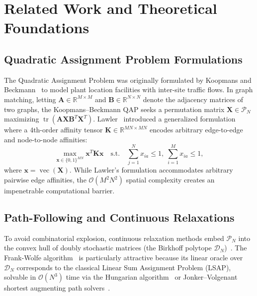 \documentclass[a4paper,fleqn]{cas-dc}
\theoremstyle{thmstyleone}
\theoremstyle{thmstyletwo}
\theoremstyle{thmstylethree}
\begin{document}
\section{Related Work and Theoretical Foundations}
\label{sec:related}

\subsection{Quadratic Assignment Problem Formulations}
The Quadratic Assignment Problem was originally formulated by Koopmans and Beckmann~\cite{koopmans1957} to model plant location facilities with inter-site traffic flows. In graph matching, letting $\mathbf{A} \in \mathbb{R}^{M \times M}$ and $\mathbf{B} \in \mathbb{R}^{N \times N}$ denote the adjacency matrices of two graphs, the Koopmans--Beckmann QAP seeks a permutation matrix $\mathbf{X} \in \mathcal{P}_N$ maximizing $\operatorname{tr}(\mathbf{A}\mathbf{X}\mathbf{B}^T\mathbf{X}^T)$. Lawler~\cite{lawler1963} introduced a generalized formulation where a 4th-order affinity tensor $\mathbf{K} \in \mathbb{R}^{MN \times MN}$ encodes arbitrary edge-to-edge and node-to-node affinities:
\begin{equation}
\max_{\mathbf{x} \in \{0, 1\}^{MN}} \mathbf{x}^T \mathbf{K} \mathbf{x} \quad \text{s.t.} \quad \sum_{j=1}^N x_{ia} \le 1, \; \sum_{i=1}^M x_{ia} \le 1,
\label{eq:lawler_qap}
\end{equation}
where $\mathbf{x} = \operatorname{vec}(\mathbf{X})$. While Lawler's formulation accommodates arbitrary pairwise edge affinities, the $\mathcal{O}(M^2 N^2)$ spatial complexity creates an impenetrable computational barrier.

\subsection{Path-Following and Continuous Relaxations}
To avoid combinatorial explosion, continuous relaxation methods embed $\mathcal{P}_N$ into the convex hull of doubly stochastic matrices (the Birkhoff polytope $\mathcal{D}_N$)~\cite{birkhoff1946}. The Frank-Wolfe algorithm~\cite{frank1956algorithm, jaggi2013revisiting} is particularly attractive because its linear oracle over $\mathcal{D}_N$ corresponds to the classical Linear Sum Assignment Problem (LSAP), solvable in $\mathcal{O}(N^3)$ time via the Hungarian algorithm~\cite{kuhn1955hungarian} or Jonker--Volgenant shortest augmenting path solvers~\cite{burkard2009assignment}.
\end{document}
